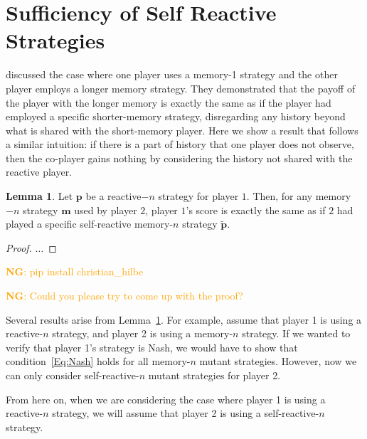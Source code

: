 \documentclass{article}
\newcommand{\nikoleta}[1]{\textcolor{orange}{\textbf{NG}: #1}}
\theoremstyle{definition}
\newtheorem{lemma}[theorem]{Lemma}
\begin{document}

\section{Sufficiency of Self Reactive Strategies}\label{section:self_reactive_sufficiency}


\cite{press:PNAS:2012} discussed the case where one player uses a memory-1
strategy and the other player employs a longer memory strategy. They
demonstrated that the payoff of the player with the longer memory is exactly the
same as if the player had employed a specific shorter-memory strategy,
disregarding any history beyond what is shared with the short-memory player.
Here we show a result that follows a similar intuition: if there is a part of
history that one player does not observe, then the co-player gains nothing by
considering the history not shared with the reactive player.

\begin{lemma}\label{lemma:self_reactive_sufficiency}
  Let $\mathbf{p}$ be a reactive$-n$ strategy for player $1$. Then, for any
  memory$-n$ strategy $\mathbf{m}$ used by player $2$, player $1$'s score is
  exactly the same as if $2$ had played a specific self-reactive memory-$n$
  strategy $\mathbf{\tilde{p}}$.
\end{lemma}

\begin{proof}
$\dots$
\end{proof}

\nikoleta{pip install christian\_hilbe}

\nikoleta{Could you please try to come up with the proof?}

Several results arise from Lemma~\ref{lemma:self_reactive_sufficiency}. For
example, assume that player 1 is using a reactive-$n$ strategy, and player 2 is
using a memory-$n$ strategy. If we wanted to verify that player 1's strategy is
Nash, we would have to show that condition~\eqref{Eq:Nash} holds for all
memory-$n$ mutant strategies. However, now we can only consider
self-reactive-$n$ mutant strategies for player 2.

From here on, when we are considering the case where player 1 is using a
reactive-$n$ strategy, we will assume that player 2 is using a self-reactive-$n$
strategy.
\end{document}
